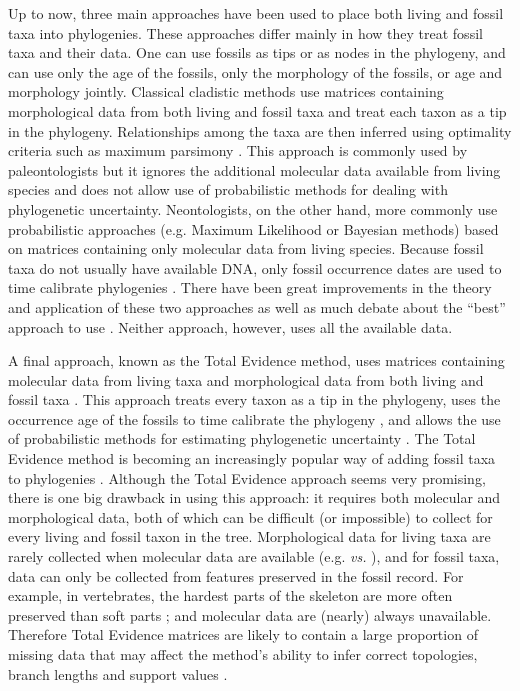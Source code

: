 Up to now, three main approaches have been used to place both living and fossil taxa into phylogenies.
These approaches differ mainly in how they treat fossil taxa and their data.
One can use fossils as tips or as nodes in the phylogeny, and can use only the age of the fossils, only the morphology of the fossils, or age and morphology jointly.
Classical cladistic methods use matrices containing morphological data from both living and fossil taxa and treat each taxon as a tip in the phylogeny. Relationships among the taxa are then inferred using optimality criteria such as maximum parsimony \citep{Hennig1966,felsenstein2004}.
This approach is commonly used by paleontologists but it ignores the additional molecular data available from living species and does not allow use of probabilistic methods for dealing with phylogenetic uncertainty.
Neontologists, on the other hand, more commonly use probabilistic approaches (e.g. Maximum Likelihood or Bayesian methods) based on matrices containing only molecular data from living species.
Because fossil taxa do not usually have available DNA, only fossil occurrence dates are used to time calibrate phylogenies \citep{zuckerkandl1965}.
There have been great improvements in the theory and application of these two approaches \citep[e.g.][]{bapsta2013,stadlerdating2013,heaththe2013} as well as much debate about the ``best'' approach to use \citep[e.g.][]{spencerefficacy2013,wrightbayesian2014}.
Neither approach, however, uses all the available data.

A final approach, known as the Total Evidence method, uses matrices containing molecular data from living taxa and morphological data from both living and fossil taxa \citep{eernissetaxonomic1993}.
This approach treats every taxon as a tip in the phylogeny, uses the occurrence age of the fossils to time calibrate the phylogeny \citep[known as tip-dating;][]{ronquista2012}, and allows the use of probabilistic methods for estimating phylogenetic uncertainty \citep{ronquista2012}.
The Total Evidence method is becoming an increasingly popular way of adding fossil taxa to phylogenies \citep[e.g.][]{pyrondivergence2011,ronquista2012,schragocombining2013,Slater2012MEE,beckancient2014,Arcila2015131}.
Although the Total Evidence approach seems very promising, there is one big drawback in using this approach: it requires both molecular and morphological data, both of which can be difficult (or impossible) to collect for every living and fossil taxon in the tree.
Morphological data for living taxa are rarely collected when molecular data are available (e.g. \citealp{O'Leary08022013} \textit{vs.} \citealp{meredithimpacts2011}), and for fossil taxa, data can only be collected from features preserved in the fossil record.
For example, in vertebrates, the hardest parts of the skeleton are more often preserved than soft parts \citep{sansomfossilization2013}; and molecular data are (nearly) always unavailable.
Therefore Total Evidence matrices are likely to contain a large proportion of missing data that may affect the method's ability to infer correct topologies, branch lengths and support values \citep{salamin2003}. 

